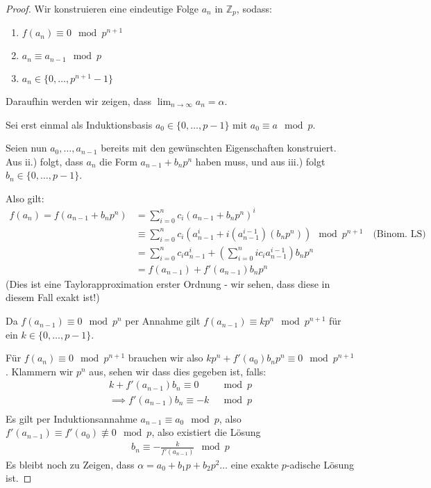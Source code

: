 \documentclass{report}
\newcommand*{\newpar}{\par\vspace{\baselineskip}\noindent}
\newcommand{\bZ}{\mathbb{Z}}
\begin{document}
	\begin{proof}
		Wir konstruieren eine eindeutige Folge $a_n$ in $\bZ_p$, sodass:
		\begin{enumerate}
			\item $f(a_n) \equiv 0 \mod p^{n + 1}$
			\item $a_n \equiv a_{n - 1} \mod p$
			\item $a_n \in  \{0, \hdots, p^{n+1} - 1\}$
		\end{enumerate}
	\noindent Daraufhin werden wir zeigen, dass $\displaystyle \lim_{n \to \infty} a_n = \alpha$.
	\newpar
	Sei erst einmal als Induktionsbasis $a_0 \in \{0, \hdots, p - 1\}$ mit $a_0 \equiv a \mod p$.
	\newpar
	Seien nun $a_0, \hdots, a_{n-1}$ bereits mit den gewünschten Eigenschaften konstruiert.
	Aus ii.) folgt, dass $a_n$ die Form $a_{n-1} + b_np^n$ haben muss, und aus iii.) folgt $b_n \in \{0, \hdots, p-1\}$.
	\newpar 
	Also gilt:
	\begin{align*}
		f(a_n) = f(a_{n - 1} + b_np^n) &= \sum_{i = 0}^n c_i(a_{n - 1} + b_np^n)^i\\
			                         &\equiv \sum_{i = 0}^n c_i(a_{n-1}^i + i(a_{n-1}^{i-1})(b_np^n)) \mod p^{n+1} \quad\text{(Binom. LS)}\\
			                    	 &= \sum_{i = 0}^n c_ia_{n-1}^i + \left(\sum_{i = 0}^nic_i a_{n-1}^{i-1}\right)b_np^n\\
			                    	 &= f(a_{n-1}) + f'(a_{n-1}) b_n p^n
	\end{align*}
	(Dies ist eine Taylorapproximation erster Ordnung - wir sehen, dass diese in diesem Fall exakt ist!)
	\newpar
	Da $f(a_{n-1}) \equiv 0 \mod p^n$ per Annahme gilt $f(a_{n-1}) \equiv kp^{n} \mod p^{n+1}$ für ein $k \in \{0, \hdots, p-1\}$.
	\newpar
	Für $f(a_n) \equiv 0 \mod p^{n+1}$ brauchen wir also $kp^{n} + f'(a_0) b_n p^n \equiv 0 \mod p^{n+1}$. Klammern wir $p^n$ aus, sehen wir dass dies gegeben ist, falls:
	\begin{align*}
		k + f'(a_{n-1}) b_n \equiv 0 &\mod p\\
		\implies f'(a_{n-1}) b_n \equiv -k &\mod p\\
	\end{align*}
	Es gilt per Induktionsannahme $a_{n-1} \equiv a_0 \mod p$, also $f'(a_{n-1}) \equiv f'(a_0) \not\equiv 0 \mod p$, also existiert die Lösung
	\begin{align*}
		b_n \equiv -\frac{k}{f'(a_{n-1})} \mod p
	\end{align*}
	Es bleibt noch zu Zeigen, dass $\alpha = a_0 + b_1p + b_2p^2 \hdots$ eine exakte $p$-adische Lösung ist. 

\end{proof}
\end{document}
